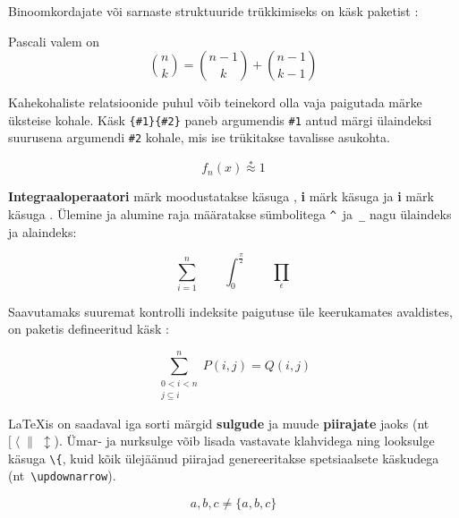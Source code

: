 Binoomkordajate või sarnaste struktuuride
trükkimiseks on käsk
 paketist :
\begin{example}
Pascali valem on
\begin{equation*}
 \binom{n}{k} =\binom{n-1}{k}
 + \binom{n-1}{k-1}
\end{equation*}
\end{example}

Kahekohaliste relatsioonide puhul võib teinekord olla vaja paigutada
märke üksteise kohale. Käsk \verb|{#1}{#2}| paneb
argumendis \verb|#1| antud märgi ülaindeksi suurusena argumendi
\verb|#2| kohale, mis ise trükitakse tavalisse asukohta.
\begin{example}
\begin{equation*}
 f_n(x) \stackrel{*}{\approx} 1
\end{equation*}
\end{example}

\textbf{Integraaloperaatori} märk
moodustatakse käsuga , \textbf{i} märk käsuga
 ja \textbf{i} märk käsuga .
Ülemine ja alumine raja määratakse sümbolitega
\verb|^|~ja~\verb|_| nagu
ülaindeks ja alaindeks:
\begin{example}
\begin{equation*}
\sum_{i=1}^n \qquad
\int_0^{\frac{\pi}{2}} \qquad
\prod_\epsilon
\end{equation*}
\end{example}

Saavutamaks suuremat kontrolli indeksite paigutuse üle keerukamates
avaldistes, on paketis  defineeritud käsk :
\begin{example}
\begin{equation*}
\sum^n_{\substack{0<i<n \\
        j\subseteq i}}
   P(i,j) = Q(i,j)
\end{equation*}
\end{example}

\LaTeX is on saadaval iga sorti märgid \textbf{sulgude}
ja muude \textbf{piirajate} jaoks
(nt~$[\;\langle\;\|\;\updownarrow$). Ümar- ja nurksulge võib lisada
vastavate klahvidega ning looksulge käsuga \verb|\{|, kuid kõik
ülejäänud piirajad genereeritakse spetsiaalsete käskudega
(nt~\verb|\updownarrow|).
\begin{example}
\begin{equation*}
{a,b,c} \neq \{a,b,c\}
\end{equation*}
\end{example}

